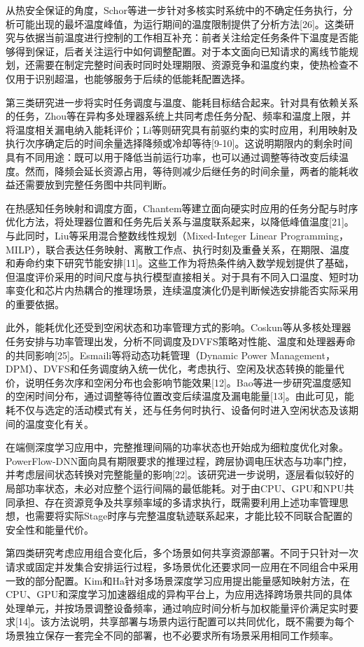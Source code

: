 从热安全保证的角度，Schor等进一步针对多核实时系统中的不确定任务执行，分析可能出现的最坏温度峰值，为运行期间的温度限制提供了分析方法{[}26{]}。这类研究与依据当前温度进行控制的工作相互补充：前者关注给定任务条件下温度是否能够得到保证，后者关注运行中如何调整配置。对于本文面向已知请求的离线节能规划，还需要在制定完整时间表时同时处理期限、资源竞争和温度约束，使热检查不仅用于识别超温，也能够服务于后续的低能耗配置选择。

第三类研究进一步将实时任务调度与温度、能耗目标结合起来。针对具有依赖关系的任务，Zhou等在异构多处理器系统上共同考虑任务分配、频率和温度上限，并将温度相关漏电纳入能耗评价；Li等则研究具有前驱约束的实时应用，利用映射及执行次序确定后的时间余量选择降频或冷却等待{[}9-10{]}。这说明期限内的剩余时间具有不同用途：既可以用于降低当前运行功率，也可以通过调整等待改变后续温度。然而，降频会延长资源占用，等待则减少后继任务的时间余量，两者的能耗收益还需要放到完整任务图中共同判断。

在热感知任务映射和调度方面，Chantem等建立面向硬实时应用的任务分配与时序优化方法，将处理器位置和任务先后关系与温度联系起来，以降低峰值温度{[}21{]}。与此同时，Liu等采用混合整数线性规划（Mixed-Integer Linear Programming，MILP），联合表达任务映射、离散工作点、执行时刻及重叠关系，在期限、温度和寿命约束下研究节能安排{[}11{]}。这些工作为将热条件纳入数学规划提供了基础，但温度评价采用的时间尺度与执行模型直接相关。对于具有不同入口温度、短时功率变化和芯片内热耦合的推理场景，连续温度演化仍是判断候选安排能否实际采用的重要依据。

此外，能耗优化还受到空闲状态和功率管理方式的影响。Coskun等从多核处理器任务安排与功率管理出发，分析不同调度及DVFS策略对性能、温度和处理器寿命的共同影响{[}25{]}。Esmaili等将动态功耗管理（Dynamic Power Management，DPM）、DVFS和任务调度纳入统一优化，考虑执行、空闲及状态转换的能量代价，说明任务次序和空闲分布也会影响节能效果{[}12{]}。Bao等进一步研究温度感知的空闲时间分布，通过调整等待位置改变后续温度及漏电能量{[}13{]}。由此可见，能耗不仅与选定的活动模式有关，还与任务何时执行、设备何时进入空闲状态及该期间的温度变化有关。

在端侧深度学习应用中，完整推理间隔的功率状态也开始成为细粒度优化对象。PowerFlow-DNN面向具有期限要求的推理过程，跨层协调电压状态与功率门控，并考虑层间状态转换对完整能量的影响{[}22{]}。该研究进一步说明，逐层看似较好的局部功率状态，未必对应整个运行间隔的最低能耗。对于由CPU、GPU和NPU共同承担、存在资源竞争及共享频率域的多请求执行，既需要利用上述功率管理思想，也需要将实际Stage时序与完整温度轨迹联系起来，才能比较不同联合配置的安全性和能量代价。

第四类研究考虑应用组合变化后，多个场景如何共享资源部署。不同于只针对一次请求或固定并发集合安排运行过程，多场景优化还要求同一应用在不同组合中采用一致的部分配置。Kim和Ha针对多场景深度学习应用提出能量感知映射方法，在CPU、GPU和深度学习加速器组成的异构平台上，为应用选择跨场景共同的具体处理单元，并按场景调整设备频率，通过响应时间分析与加权能量评价满足实时要求{[}14{]}。该方法说明，共享部署与场景内运行配置可以共同优化，既不需要为每个场景独立保存一套完全不同的部署，也不必要求所有场景采用相同工作频率。

